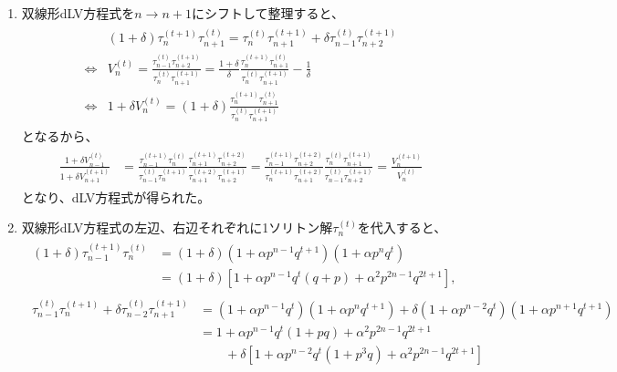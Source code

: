 \documentclass{jsarticle}
\begin{document}
\begin{enumerate}
\item 双線形dLV方程式を$n\to n+1$にシフトして整理すると、
\begin{align}
\begin{split}
&(1+\delta)\tau_{n}^{(t+1)}\tau_{n+1}^{(t)}=\tau_{n}^{(t)}\tau_{n+1}^{(t+1)}
+\delta\tau_{n-1}^{(t)}\tau_{n+2}^{(t+1)}
\\
\Leftrightarrow&
V_{n}^{(t)}=\frac{\tau_{n-1}^{(t)}\tau_{n+2}^{(t+1)}}{\tau_{n}^{(t)}\tau_{n+1}^{(t+1)}}
=\frac{1+\delta}{\delta}\frac{\tau_{n}^{(t+1)}\tau_{n+1}^{(t)}}{\tau_{n}^{(t)}\tau_{n+1}^{(t+1)}}-\frac{1}{\delta}\\
\Leftrightarrow&
1+\delta V_{n}^{(t)}=(1+\delta)\frac{\tau_{n}^{(t+1)}\tau_{n+1}^{(t)}}
{\tau_{n}^{(t)}\tau_{n+1}^{(t+1)}}
\end{split}
\end{align}
となるから、
\begin{align}
\begin{split}
\frac{1+\delta V_{n-1}^{(t)}}{1+\delta V_{n+1}^{(t+1)}}
&=\frac{\tau_{n-1}^{(t+1)}\tau_{n}^{(t)}}{\tau_{n-1}^{(t)}\tau_{n}^{(t+1)}}
\frac{\tau_{n+1}^{(t+1)}\tau_{n+2}^{(t+2)}}{\tau_{n+1}^{(t+2)}\tau_{n+2}^{(t+1)}}
=\frac{\tau_{n-1}^{(t+1)}\tau_{n+2}^{(t+2)}}{\tau_{n}^{(t+1)}\tau_{n+1}^{(t+2)}}
\frac{\tau_{n}^{(t)}\tau_{n+1}^{(t+1)}}{\tau_{n-1}^{(t)}\tau_{n+2}^{(t+1)}}
=\frac{V_{n}^{(t+1)}}{V_{n}^{(t)}}
\end{split}
\end{align}
となり、dLV方程式が得られた。
\item 
双線形dLV方程式の左辺、右辺それぞれに1ソリトン解$\tau_{n}^{(t)}$を代入すると、
\begin{align}
\begin{split}
(1+\delta)\tau_{n-1}^{(t+1)}\tau_{n}^{(t)}
&=(1+\delta)(1+\alpha p^{n-1}q^{t+1})(1+\alpha p^{n}q^{t})\\
&=(1+\delta)\left[1+\alpha p^{n-1}q^{t}(q+p)+\alpha^{2}p^{2n-1}q^{2t+1}\right],
\end{split}\\
\begin{split}
\tau_{n-1}^{(t)}\tau_{n}^{(t+1)}+\delta\tau_{n-2}^{(t)}\tau_{n+1}^{(t+1)}
&=(1+\alpha p^{n-1}q^{t})(1+\alpha p^{n}q^{t+1})
+\delta(1+\alpha p^{n-2}q^{t})(1+\alpha p^{n+1}q^{t+1})\\
&=1+\alpha p^{n-1}q^{t}(1+pq)+\alpha^{2}p^{2n-1}q^{2t+1}\\
&\qquad+\delta\left[1+\alpha p^{n-2}q^{t}(1+p^{3}q)+\alpha^{2}p^{2n-1}q^{2t+1}\right]
\end{split}

\end{align}
\end{enumerate}
\end{document}
